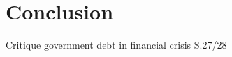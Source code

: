 \documentclass[12pt,a4paper,oneside,titlepage]{article}
\begin{document}


\section{Conclusion}

\citet{Afonso.2010}
Critique government debt in financial crisis S.27/28

\citet{Erceg.2014}
\citet{CoenenG..2010}\citet{Erceg.2014}

\citet{Eggertsson.2011}
\citet{Coenen.2010}


\pagebreak[4]




%
%
%
%



\newpage
\end{document}
